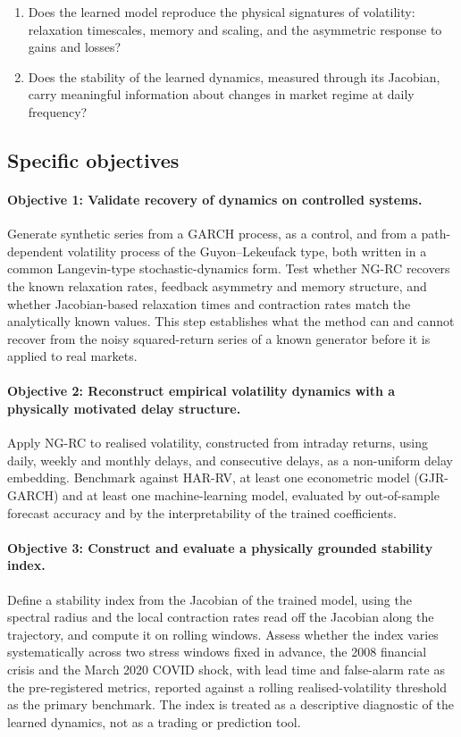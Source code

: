 \documentclass[12pt,a4paper]{article}
\begin{document}
\begin{enumerate}\renewcommand{\labelenumi}{\textbf{Q\arabic{enumi}.}}
\item Does the learned model reproduce the physical
signatures of volatility: relaxation timescales, memory and scaling, and
the asymmetric response to gains and losses?
\item Does the stability of the learned dynamics, measured through its
Jacobian, carry meaningful information about changes in market regime at
daily frequency?
\end{enumerate}

\subsection{Specific objectives}

\paragraph{Objective 1: Validate recovery of dynamics on controlled
systems.}
Generate synthetic series from a GARCH process, as a control, and from a
path-dependent volatility process of the Guyon--Lekeufack type, both
written in a common Langevin-type stochastic-dynamics form. Test whether
NG-RC recovers the known relaxation rates, feedback asymmetry and memory
structure, and whether Jacobian-based relaxation times and contraction
rates match the analytically known values. This step establishes what
the method can and cannot recover from the noisy squared-return series
of a known generator before it is applied to real markets.

\paragraph{Objective 2: Reconstruct empirical volatility dynamics with a
physically motivated delay structure.}
Apply NG-RC to realised volatility, constructed from intraday returns,
using daily, weekly and monthly delays, and consecutive delays, as a
non-uniform delay embedding. Benchmark against HAR-RV, at least one
econometric model (GJR-GARCH) and at least one machine-learning model,
evaluated by out-of-sample forecast accuracy and by the interpretability
of the trained coefficients.

\paragraph{Objective 3: Construct and evaluate a physically grounded
stability index.}
Define a stability index from the Jacobian of the trained model, using
the spectral radius and the local contraction rates read off the
Jacobian along the trajectory, and compute it on rolling windows. Assess whether the
index varies systematically across two stress windows fixed in
advance, the 2008 financial crisis and the March 2020 COVID shock, with
lead time and false-alarm rate as the pre-registered metrics, reported
against a rolling realised-volatility threshold as the primary
benchmark. The
index is treated as a descriptive diagnostic of the learned dynamics, not
as a trading or prediction tool.
\end{document}
